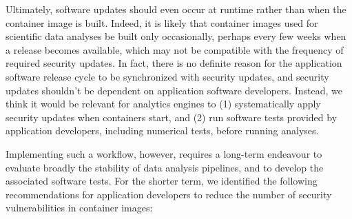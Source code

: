 \documentclass[a4paper,num-refs]{oup-contemporary}
\begin{document}
Ultimately, software updates should even occur at runtime rather than when
the container image is built. Indeed, it is likely that container images
used for scientific data analyses be built only occasionally, perhaps every
few weeks when a release becomes available, which may not be compatible
with the frequency of required security updates. In fact, there is no
definite reason for the application software release cycle to be
synchronized with security updates, and security updates shouldn't be
dependent on application software developers. Instead, we think it would be
relevant for analytics engines to (1) systematically apply security updates
when containers start, and (2) run software tests provided by application
developers, including numerical tests, before running analyses. 

Implementing such a workflow, however, requires a long-term endeavour to
evaluate broadly the stability of data analysis pipelines, and to develop
the associated software tests. For the shorter term, we identified the
following recommendations for application developers to reduce the number
of security vulnerabilities in container images:
\end{document}
